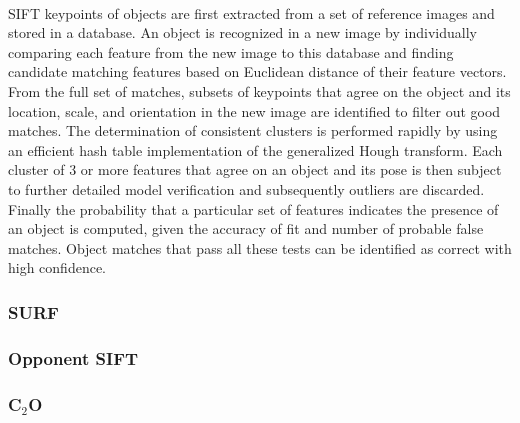\documentclass[12pt]{article}
\begin{document}
\paragraph{}
SIFT keypoints of objects are first extracted from a set of reference images and stored in a database. An object is recognized in a new image by individually comparing each feature from the new image to this database and finding candidate matching features based on Euclidean distance of their feature vectors. From the full set of matches, subsets of keypoints that agree on the object and its location, scale, and orientation in the new image are identified to filter out good matches. The determination of consistent clusters is performed rapidly by using an efficient hash table implementation of the generalized Hough transform. Each cluster of 3 or more features that agree on an object and its pose is then subject to further detailed model verification and subsequently outliers are discarded. Finally the probability that a particular set of features indicates the presence of an object is computed, given the accuracy of fit and number of probable false matches. Object matches that pass all these tests can be identified as correct with high confidence.

\subsubsection{SURF}

\subsubsection{Opponent SIFT}

\subsubsection{C$_2$O}

\end{document}
